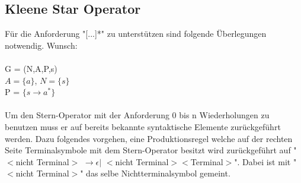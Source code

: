 \documentclass[12pt]{scrartcl}
\begin{document}
	\subsection{Kleene Star Operator}
	Für die Anforderung "[...]*" zu unterstützen sind folgende Überlegungen notwendig. Wunsch: \\ \\
	G = (N,A,P,s) \\
	$A = \{a\}$, $N = \{s\}$ \\
	P = $\{s \to a^{*}\}$ \\ \\
	Um den Stern-Operator mit der Anforderung 0 bis n Wiederholungen zu benutzen muss er auf bereits bekannte syntaktische Elemente zurückgeführt werden. Dazu folgendes vorgehen, eine Produktionsregel welche auf der rechten Seite Terminalsymbole mit dem Stern-Operator besitzt wird zurückgeführt auf "$<$nicht Terminal$>$ $\to \epsilon \vert$ $<$nicht Terminal$><$Terminal$>$". Dabei ist mit "$<$nicht Terminal$>$" das selbe Nichtterminalsymbol gemeint. \\
	
\end{document}
